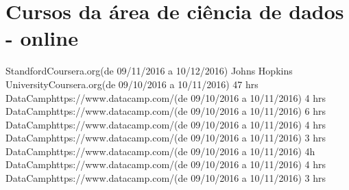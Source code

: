 \section{Cursos da área de ciência de dados - online}
 {Standford}{Coursera.org}{(de 09/11/2016 a 10/12/2016)}{}
 {Johns Hopkins University}{Coursera.org}{(de 09/10/2016 a 10/11/2016)}{ 47 hrs\newline{}}
 {DataCamp}{https://www.datacamp.com/}{(de 09/10/2016 a 10/11/2016)}{ 4 hrs\newline{}}
 {DataCamp}{https://www.datacamp.com/}{(de 09/10/2016 a 10/11/2016)}{ 6 hrs\newline{}}
 {DataCamp}{https://www.datacamp.com/}{(de 09/10/2016 a 10/11/2016)}{ 4 hrs\newline{}}
 {DataCamp}{https://www.datacamp.com/}{(de 09/10/2016 a 10/11/2016)}{ 3 hrs\newline{}}
 {DataCamp}{https://www.datacamp.com/}{(de 09/10/2016 a 10/11/2016)}{ 4h\newline{}}
 {DataCamp}{https://www.datacamp.com/}{(de 09/10/2016 a 10/11/2016)}{ 4 hrs\newline{}}
 {DataCamp}{https://www.datacamp.com/}{(de 09/10/2016 a 10/11/2016)}{ 3 hrs\newline{}}



